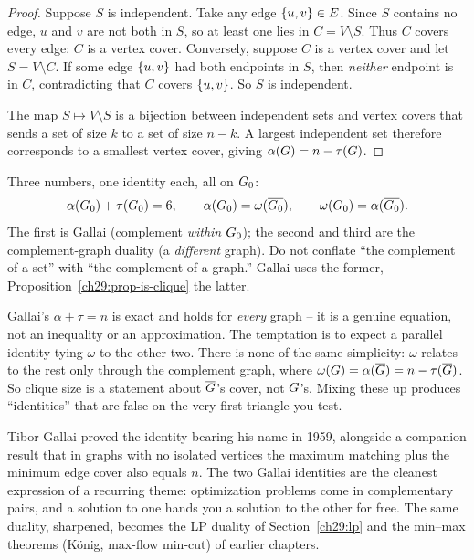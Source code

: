 \begin{proof}
Suppose $S$ is independent. Take any edge $\{u,v\}\in E$. Since $S$ contains no
edge, $u$ and $v$ are not both in $S$, so at least one lies in $C=V\setminus S$.
Thus $C$ covers every edge: $C$ is a vertex cover. Conversely, suppose $C$ is a
vertex cover and let $S=V\setminus C$. If some edge $\{u,v\}$ had both
endpoints in $S$, then \emph{neither} endpoint is in $C$, contradicting that $C$
covers $\{u,v\}$. So $S$ is independent.

The map $S\mapsto V\setminus S$ is a bijection between independent sets and
vertex covers that sends a set of size $k$ to a set of size $n-k$. A largest
independent set therefore corresponds to a smallest vertex cover, giving
$\alpha(G)=n-\tau(G)$.
\end{proof}

\begin{focusbox}
Three numbers, one identity each, all on $G_0$:
\[
   \alpha(G_0)+\tau(G_0)=6,\qquad
   \alpha(G_0)=\omega(\overline{G_0}),\qquad
   \omega(G_0)=\alpha(\overline{G_0}).
\]
The first is Gallai (complement \emph{within} $G_0$); the second and third are
the complement-graph duality (a \emph{different} graph). Do not conflate ``the
complement of a set'' with ``the complement of a graph.'' Gallai uses the former,
Proposition~\ref{ch29:prop-is-clique} the latter.
\end{focusbox}

\begin{trapbox}
Gallai's $\alpha+\tau=n$ is exact and holds for \emph{every} graph -- it is a
genuine equation, not an inequality or an approximation. The temptation is to
expect a parallel identity tying $\omega$ to the other two. There is none of the
same simplicity: $\omega$ relates to the rest only through the complement graph,
where $\omega(G)=\alpha(\overline{G})=n-\tau(\overline{G})$. So clique
size is a statement about $\overline{G}$'s cover, not $G$'s. Mixing these
up produces ``identities'' that are false on the very first triangle you test.
\end{trapbox}

\begin{historybox}
Tibor Gallai proved the identity bearing his name in 1959, alongside a companion
result that in graphs with no isolated vertices the maximum matching plus the
minimum edge cover also equals $n$. The two Gallai identities are the cleanest
expression of a recurring theme: optimization problems come in complementary
pairs, and a solution to one hands you a solution to the other for free. The same
duality, sharpened, becomes the LP duality of Section~\ref{ch29:lp} and the
min--max theorems (K\"onig, max-flow min-cut) of earlier chapters.
\end{historybox}

